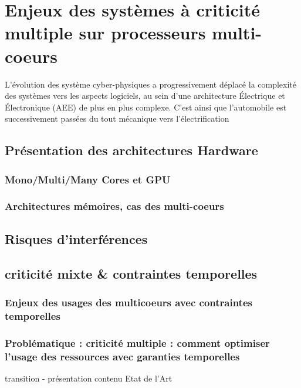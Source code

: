 \documentclass[french, a4paper, 11pt, twoside, pdftex]{StyleThese}
\begin{document}
\setcounter{chapter}{1}
\dominitoc
\faketableofcontents
\fi

\chapter{Enjeux des systèmes à criticité multiple sur processeurs multi-coeurs}
\minitoc

L'évolution des système cyber-physiques a progressivement déplacé la complexité des systèmes vers les aspects logiciels, au sein d'une architecture Électrique et Électronique (AEE) de plus en plus complexe. C'est ainsi que l'automobile est successivement passées du tout mécanique vers l'électrification 

\section{Présentation des architectures Hardware}
    \subsection{Mono/Multi/Many Cores et GPU}
    \subsection{Architectures mémoires, cas des multi-coeurs}
\section{Risques d'interférences}
\section{criticité mixte \& contraintes temporelles}
    \subsection{Enjeux des usages des multicoeurs avec contraintes temporelles}
    \subsection{Problématique :  criticité multiple : comment optimiser l'usage des ressources avec garanties temporelles}
transition - présentation contenu Etat de l'Art


\ifdefined{}
\else


\end{document}
